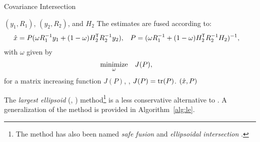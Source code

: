 \begin{algorithm}[tb]
	\caption{Covariance Intersection}
	\label{alg:ci}
	\begin{small}
	\begin{algorithmic}[0]
		\Input $(y_1,R_1)$, $(y_2,R_2)$, and $H_2$
		\State The estimates are fused according to:
		\begin{align} 
			\hat{x} &= P(\omega R_1^{-1} y_1 + (1-\omega)H_2^{\mkern-1.5mu\mathsf{T}} R_2^{-1} y_2 ), & P &= (\omega R_1^{-1} + (1-\omega)H_2^{\mkern-1.5mu\mathsf{T}} R_2^{-1} H_2)^{-1},
			\label{eq:method:ci-2est}
		\end{align}
		with $\omega$ given by
		\begin{equation}
			\begin{aligned}
				& \underset{\omega}{\operatorname*{\rm minimize}}& & J(P),
			\end{aligned}
		\end{equation}
		for a matrix increasing function $J(P)$, \eg, $J(P)=\operatorname*{\rm tr}(P)$.
		\Output $(\hat{x},P)$
	\end{algorithmic}
	\end{small}
\end{algorithm}



The \emph{largest ellipsoid} (\abbrLE, \cite{Benaskeur2002IECON}) method\footnote{The \abbrLE method has also been named \emph{safe fusion} \cite{Gustafsson2018} and \emph{ellipsoidal intersection} \cite{Sijs2010ACC}.} is a less conservative alternative to \abbrCI. A generalization of the \abbrLE method is provided in Algorithm~\ref{alg:le}.

